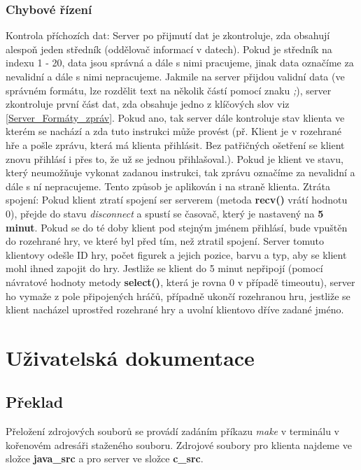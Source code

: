 \documentclass[12pt, a4paper]{article}
\begin{document}
\subsubsection{Chybové řízení}
\label{Chybove_rizeni}
Kontrola příchozích dat: Server po přijmutí dat je zkontroluje, zda obsahují alespoň jeden středník (oddělovač informací v datech). Pokud je středník na indexu 1 - 20, data jsou správná a dále s nimi pracujeme, jinak data označíme za nevalidní a dále s nimi nepracujeme.
\newline
Jakmile na server přijdou validní data (ve správném formátu, lze rozdělit text na několik částí pomocí znaku \textit{;}), server zkontroluje první část dat, zda obsahuje jedno z klíčových slov viz \ref{Server_Formáty_zpráv}. Pokud ano, tak server dále kontroluje stav klienta ve kterém se nachází a zda tuto instrukci může provést (př. Klient je v rozehrané hře a pošle zprávu, která má klienta přihlásit. Bez patřičných ošetření se klient znovu přihlásí i přes to, že už se jednou přihlašoval.). Pokud je klient ve stavu, který neumožňuje vykonat zadanou instrukci, tak zprávu označíme za nevalidní a dále s ní nepracujeme. Tento způsob je aplikován i na straně klienta.
\newline
Ztráta spojení: Pokud klient ztratí spojení ser serverem (metoda \textbf{recv()} vrátí hodnotu 0), přejde do stavu \textit{disconnect} a spustí se časovač, který je nastavený na \textbf{5 minut}. Pokud se do té doby klient pod stejným jménem přihlásí, bude vpuštěn do rozehrané hry, ve které byl před tím, než ztratil spojení. Server tomuto klientovy odešle ID hry, počet figurek a jejich pozice, barvu a typ, aby se klient mohl ihned zapojit do hry.
\newline
Jestliže se klient do 5 minut nepřipojí (pomocí návratové hodnoty metody \textbf{select()}, která je rovna 0 v případě timeoutu), server ho vymaže z pole připojených hráčů, případně ukončí rozehranou hru, jestliže se klient nacházel uprostřed rozehrané hry a uvolní klientovo dříve zadané jméno. 
\section{Uživatelská dokumentace}
\label{Uživatelská_dokumentace}
\subsection{Překlad}
\label{Překlad}
Přeložení zdrojových souborů se provádí zadáním příkazu \textit{make} v terminálu v kořenovém adresáři staženého souboru. Zdrojové soubory pro klienta najdeme ve složce \textbf{\/java\_src\/} a pro server ve složce \textbf{\/c\_src\/}.
\end{document}
